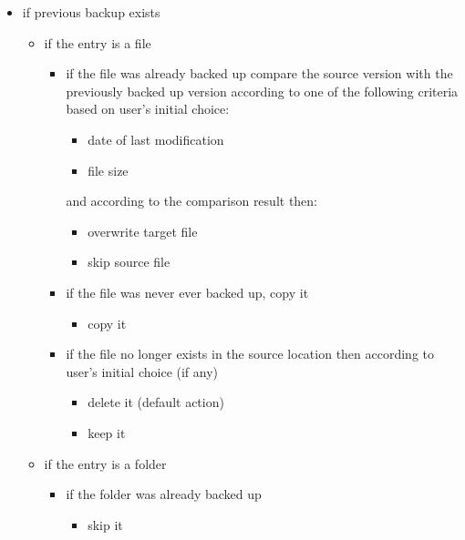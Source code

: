 \documentclass[a4paper]{article}
\begin{document}
        \begin{itemize}
          \item if previous backup exists
            \begin{itemize}
              \item if the entry is a file
                \begin{itemize}
                  \item if the file was already backed up compare the source version with the previously backed up version according to one of the following criteria based on user's initial choice:
                    \begin{itemize}
                      \item date of last modification
                      \item file size
                    \end{itemize}
                    and according to the comparison result then:
                    \begin{itemize}
                      \item overwrite target file
                      \item skip source file
                    \end{itemize}
                  \item if the file was never ever backed up, copy it
                    \begin{itemize}
                      \item copy it
                    \end{itemize}
                  \item if the file no longer exists in the source location then according to user's initial choice (if any)
                    \begin{itemize}
                      \item delete it (default action)
                      \item keep it
                    \end{itemize}
                \end{itemize}
              \item if the entry is a folder
                \begin{itemize}
                  \item if the folder was already backed up
                    \begin{itemize}
                      \item skip it

\end{itemize}
\end{itemize}
\end{itemize}
\end{itemize}
\end{document}
